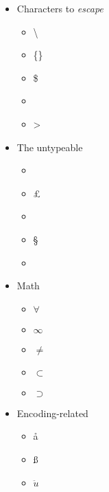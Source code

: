 \documentclass[12pt]{article}
\begin{document}
\begin{itemize}
    \item Characters to \textit{escape}
    \begin{itemize}
        \item \textbackslash
        \item \{\}
        \item \$
        \item \textunderscore
        \item \textgreater
    \end{itemize}
    \item The untypeable
    \begin{itemize}
        \item \dag
        \item \pounds
        \item \texttrademark
        \item \S
        \item \textquestiondown
    \end{itemize}
    \item Math
    \begin{itemize}
        \item $\forall$
        \item $\infty$
        \item $\neq$
        \item $\subset$
        \item $\supset$
    \end{itemize}
    \item Encoding-related
    \begin{itemize}
        \item  \aa
        \item \ss
        \item $\ddot{u}$  
    \end{itemize}
\end{itemize}
\end{document}
